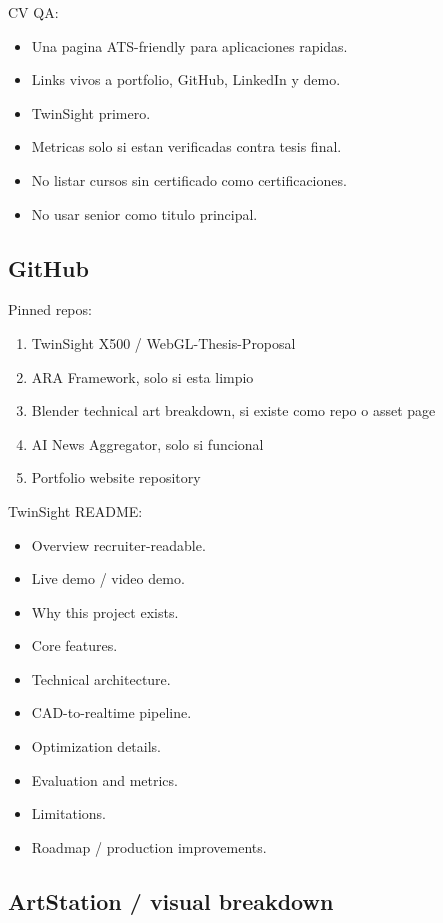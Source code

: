 CV QA:


\begin{itemize}
\item Una pagina ATS-friendly para aplicaciones rapidas.
\item Links vivos a portfolio, GitHub, LinkedIn y demo.
\item TwinSight primero.
\item Metricas solo si estan verificadas contra tesis final.
\item No listar cursos sin certificado como certificaciones.
\item No usar senior como titulo principal.
\end{itemize}


\subsection{GitHub}


Pinned repos:


\begin{enumerate}
\item TwinSight X500 / WebGL-Thesis-Proposal
\item ARA Framework, solo si esta limpio
\item Blender technical art breakdown, si existe como repo o asset page
\item AI News Aggregator, solo si funcional
\item Portfolio website repository
\end{enumerate}


TwinSight README:


\begin{itemize}
\item Overview recruiter-readable.
\item Live demo / video demo.
\item Why this project exists.
\item Core features.
\item Technical architecture.
\item CAD-to-realtime pipeline.
\item Optimization details.
\item Evaluation and metrics.
\item Limitations.
\item Roadmap / production improvements.
\end{itemize}


\subsection{ArtStation / visual breakdown}


